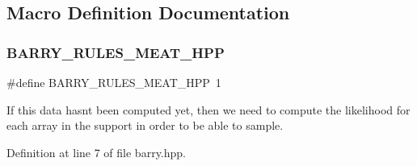 \subsection{Macro Definition Documentation}
\mbox{\label{barry_8hpp_a22467d89c9ad7e30386746c050a39478}} 
\subsubsection{\texorpdfstring{B\+A\+R\+R\+Y\+\_\+\+R\+U\+L\+E\+S\+\_\+\+M\+E\+A\+T\+\_\+\+H\+PP}{BARRY\_RULES\_MEAT\_HPP}}
{\footnotesize\ttfamily \#define B\+A\+R\+R\+Y\+\_\+\+R\+U\+L\+E\+S\+\_\+\+M\+E\+A\+T\+\_\+\+H\+PP~1}

If this data hasn\textquotesingle{}t been computed yet, then we need to compute the likelihood for each array in the support in order to be able to sample. 

Definition at line 7 of file barry.\+hpp.

